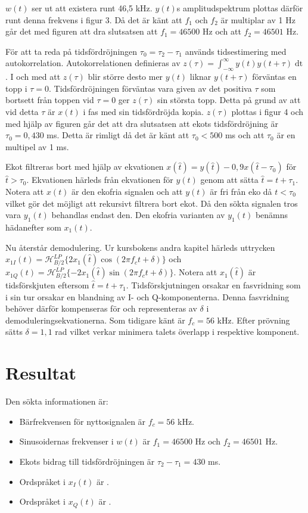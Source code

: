 \documentclass[10pt,twocolumn]{article}
\begin{document}
$w(t)$ ser ut att existera runt 46{,}5 kHz. $y(t)$s amplitudspektrum plottas därför runt denna frekvens i figur 3. Då det är känt att $f_1$ och $f_2$ är multiplar av 1 Hz går det med figuren att dra slutsatsen att $f_1=46500$ Hz och att $f_2=46501$ Hz.

För att ta reda på tidsfördröjningen $\tau_0=\tau_2-\tau_1$ används tidsestimering med autokorrelation. Autokorrelationen definieras av $z(\tau)=\int_{-\infty}^{\infty} y(t)y(t+\tau)\mathop{dt}$. I och med att $z(\tau)$ blir större desto mer $y(t)$ liknar $y(t+\tau)$ förväntas en topp i $\tau=0$. Tidsfördröjningen förväntas vara given av det positiva $\tau$ som bortsett från toppen vid $\tau=0$ ger $z(\tau)$ sin största topp. Detta på grund av att vid detta $\tau$ är $x(t)$ i fas med sin tidsfördröjda kopia. $z(\tau)$ plottas i figur 4 och med hjälp av figuren går det att dra slutsatsen att ekots tidsfördröjning är $\tau_0=0{,}430$ ms. Detta är rimligt då det är känt att $\tau_0<500$ ms och att $\tau_0$ är en multipel av 1 ms.

Ekot filtreras bort med hjälp av ekvationen $x(\hat{t})=y(\hat{t})-0{,}9x(\hat{t}-\tau_0)$ för $\hat{t} > \tau_0$. Ekvationen härleds från ekvationen för $y(t)$ genom att sätta $\hat{t}=t+\tau_1$. Notera att $x(t)$ är den ekofria signalen och att $y(t)$ är fri från eko då $t < \tau_0$ vilket gör det möjligt att rekursivt filtrera bort ekot. Då den sökta signalen tros vara $y_1(t)$ behandlas endast den. Den ekofria varianten av $y_1(t)$ benämns hädanefter som $x_1(t)$.

Nu återstår demodulering. Ur kursbokens andra kapitel härleds uttrycken $x_{1I}(t)=\mathcal{H}^{LP}_{B/2}\{2x_1(\hat{t})\cos(2\pi f_{c}t+\delta)\}$ och $x_{1Q}(t)=\mathcal{H}^{LP}_{B/2}\{-2x_1(\hat{t})\sin(2\pi f_{c}t+\delta)\}$. Notera att $x_1(\hat{t})$ är tidsförskjuten eftersom $\hat{t}=t+\tau_1$. Tidsförskjutningen orsakar en fasvridning som i sin tur orsakar en blandning av I- och Q-komponenterna. Denna fasvridning behöver därför kompenseras för och representeras av $\delta$ i demoduleringsekvationerna. Som tidigare känt är $f_c=56$ kHz. Efter prövning sätts $\delta=1{,}1$ rad vilket verkar minimera talets överlapp i respektive komponent.

\section{Resultat}

Den sökta informationen är:
\begin{itemize}
\item Bärfrekvensen för nyttosignalen är $f_c=56$ kHz.
\item Sinusoidernas frekvenser i $w(t)$ är $f_1=46500$ Hz och $f_2=46501$ Hz.
\item Ekots bidrag till tidsfördröjningen är $\tau_2-\tau_1=430$ ms.
\item Ordspråket i $x_I(t)$ är .
\item Ordspråket i $x_Q(t)$ är .
\end{itemize}
\end{document}
